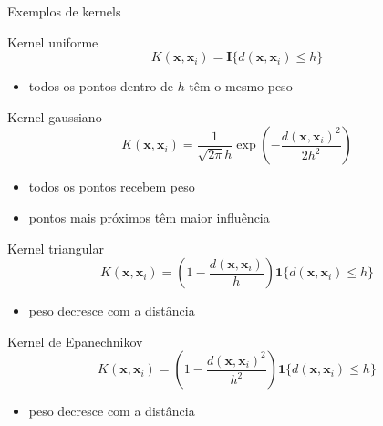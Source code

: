 \documentclass[
  ignorenonframetext,
  aspectratio=169,
]{beamer}
\providecommand{\tightlist}{%
  \setlength{\itemsep}{0pt}\setlength{\parskip}{0pt}}
\begin{document}
\begin{frame}
\begin{block}{Exemplos de kernels}
\label{exemplos-de-kernels}
\end{block}

\begin{block}{Kernel uniforme}
\label{kernel-uniforme}
\[
K(\mathbf{x}, \mathbf{x}_i) = \mathbf{I}\{d(\mathbf{x}, \mathbf{x}_i) \le h\}
\]

\begin{itemize}
\tightlist
\item
  todos os pontos dentro de \(h\) têm o mesmo peso
\end{itemize}
\end{block}

\begin{block}{Kernel gaussiano}
\label{kernel-gaussiano}
\[
K(\mathbf{x}, \mathbf{x}_i) = \frac{1}{\sqrt{2\pi}h}
\exp\left(-\frac{d(\mathbf{x}, \mathbf{x}_i)^2}{2h^2}\right)
\]

\begin{itemize}
\tightlist
\item
  todos os pontos recebem peso\\
\item
  pontos mais próximos têm maior influência
\end{itemize}
\end{block}
\end{frame}

\begin{frame}
\begin{block}{Kernel triangular}
\label{kernel-triangular}
\[
K(\mathbf{x}, \mathbf{x}_i) = \left(1 - \frac{d(\mathbf{x}, \mathbf{x}_i)}{h}\right)\mathbf{1}\{d(\mathbf{x}, \mathbf{x}_i) \le h\}
\]

\begin{itemize}
\tightlist
\item
  peso decresce com a distância
\end{itemize}
\end{block}

\begin{block}{Kernel de Epanechnikov}
\label{kernel-de-epanechnikov}
\[
K(\mathbf{x}, \mathbf{x}_i) = \left(1 - \frac{d(\mathbf{x}, \mathbf{x}_i)^2}{h^2}\right)\mathbf{1}\{d(\mathbf{x}, \mathbf{x}_i) \le h\}
\]

\begin{itemize}
\tightlist
\item
  peso decresce com a distância
\end{itemize}
\end{block}
\end{frame}
\end{document}
